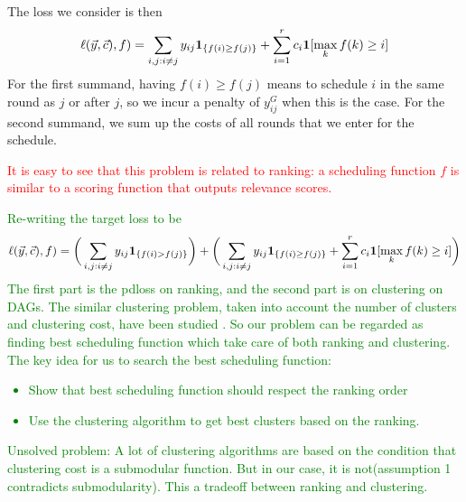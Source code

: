 The loss we consider is then
\begin{align*}
  \ell(\vec{y},\vec{c}), f)
  =\sum_{i,j: i \neq j} y_{ij} {\mathbf 1}_{\{f(i) \geq f(j)\}}+\sum_{i=1}^r c_i {\mathbf 1}[\max_k f(k) \geq i]
\end{align*}
For the first summand, having $f(i) \geq f(j)$ means to schedule $i$ in the
same round as $j$ or after $j$, so we incur a penalty of $y_{ij}^G$ when
this is the case. For the second summand, we sum up the costs of all rounds
that we enter for the schedule. 

\textcolor{red}{It is easy to see that this problem is related to ranking: a scheduling
function $f$ is similar to a scoring function that outputs relevance scores.}

\textcolor{green}{Re-writing the target loss to be
\begin{equation*}
\ell(\vec{y},\vec{c}), f)
=\bigg(\sum_{i,j: i \neq j} y_{ij} {\mathbf 1}_{\{f(i) > f(j)\}}\bigg)+\bigg(\sum_{i,j: i \neq j} y_{ij} {\mathbf 1}_{\{f(i) \geq f(j)\}}+\sum_{i=1}^r c_i {\mathbf 1}[\max_k f(k) \geq i]\bigg)
\end{equation*}
The first part is the pdloss on ranking, and the second part is on clustering on DAGs. The similar clustering problem, taken into account the number of clusters and clustering cost, have been studied \cite{Kiyohito2010MAC}. So our problem can be regarded as finding best scheduling function which take care of both ranking and clustering.
The key idea for us to search the best scheduling function:
\begin{itemize}
	\item Show that best scheduling function should respect the ranking order
	\item Use the clustering algorithm to get best clusters based on the ranking.
\end{itemize} 
Unsolved problem: A lot of clustering algorithms are based on the condition that clustering cost is a submodular function. But in our case, it is not(assumption 1 contradicts submodularity). This a tradeoff between ranking and clustering.
}

 








